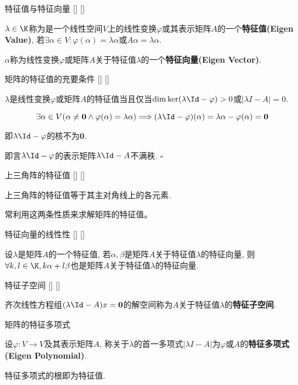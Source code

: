 \documentclass[UTF8]{ctexart}
\begin{document}
		\begin{dfn}
			[]
			{特征值与特征向量}
			[]
			[]

			$\lambda\in\K$称为是一个线性空间$V$上的线性变换$\varphi$或其表示矩阵$A$的一个\textbf{特征值(Eigen Value)}, 若$\exists \alpha\in V: \varphi(\alpha)=\lambda\alpha$或$A\alpha=\lambda\alpha$. 
			
			$\alpha$称为线性变换$\varphi$或矩阵$A$关于特征值$\lambda$的一个\textbf{特征向量(Eigen Vector)}. 
		\end{dfn}
		
		\begin{ppt}
			[]
			{矩阵的特征值的充要条件}
			[]
			[]

			$\lambda$是线性变换$\varphi$或矩阵$A$的特征值当且仅当$\dim\ker(\lambda \Id-\varphi)>0$或$|\lambda I-A|=0$. 
		\end{ppt}
		
		\begin{prf}
			\[\exists\alpha\in V(\alpha\neq\mathbf{0}\wedge\varphi(\alpha)=\lambda\alpha)\Longrightarrow (\lambda\Id-\varphi)(\alpha)=\lambda\alpha-\varphi(\alpha)=\mathbf{0}\]

			即$\lambda\Id-\varphi$的核不为$\mathbf{0}$. 

			即言$\lambda\Id-\varphi$的表示矩阵$\lambda\Id-A$不满秩. $\square$
            \end{prf}

		\begin{ppt}
			[]
			{上三角阵的特征值}
			[]
			[]

			上三角阵的特征值等于其主对角线上的各元素. 
		\end{ppt}

		常利用这两条性质来求解矩阵的特征值。
		
		\begin{ppt}
			[]
			{特征向量的线性性}
			[]
			[]

			设$\lambda$是矩阵$A$的一个特征值, 若$\alpha,\beta$是矩阵$A$关于特征值$\lambda$的特征向量, 则$\forall k,l\in\K, k\alpha+l\beta$也是矩阵$A$关于特征值$\lambda$的特征向量. 
		\end{ppt}

		\begin{dfn}
			[]
			{特征子空间}
			[]
			[]

			齐次线性方程组$(\lambda\Id-A)x=\mathbf{0}$的解空间称为$A$关于特征值$\lambda$的\textbf{特征子空间}. 
		\end{dfn}

		\begin{dfn}
			{矩阵的特征多项式}
	
			设$\varphi: V\to V$及其表示矩阵$A$, 称关于$\lambda$的首一多项式$|\lambda I-A|$为$\varphi$或$A$的\textbf{特征多项式(Eigen Polynomial)}. 
	
			特征多项式的根即为特征值. 
		\end{dfn}
		
\end{document}
